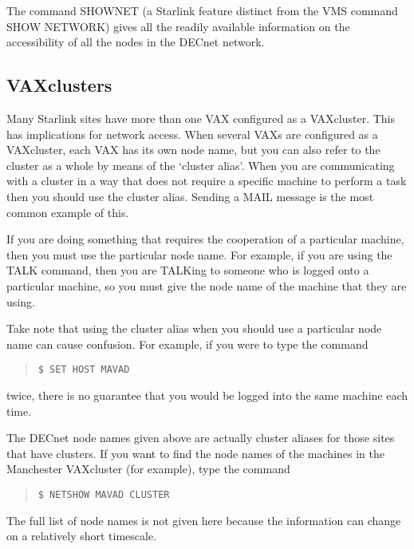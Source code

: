 The command SHOWNET (a Starlink feature distinct from the VMS command SHOW
NETWORK) gives all the readily available information on the accessibility
of all the nodes in the DECnet network.

\subsection{VAXclusters}
Many Starlink sites have more than one VAX configured as a
VAXcluster. This has implications for network access. When several VAXs are
configured as a VAXcluster, each VAX has its own node name, but you can also
refer to the cluster as a whole by means of the `cluster alias'. When you are
communicating with a cluster in a way that does not require a specific machine
to perform a task then you should use the cluster alias. Sending a MAIL message
is the most common example of this.

If you are doing something that requires the cooperation of a particular
machine, then you must use the particular node name. For example, if you are
using the TALK command, then you are TALKing to someone who is logged onto a
particular machine, so you must give the node name of the machine that they are
using. 

Take note that using the cluster alias when you should use a particular node
name can cause confusion. For example, if you were to type the command
\begin{quote}
{\tt \$ SET HOST MAVAD}
\end{quote}
twice, there is no guarantee that you would be logged into the same machine
each time.

The DECnet node names
given above are actually cluster aliases for those sites that have clusters.
If you want to find the node names of the machines in the Manchester VAXcluster
(for example), type the command
\begin{quote}
{\tt \$ NETSHOW MAVAD CLUSTER}
\end{quote}
The full list of node names is not given here because the information can
change on a relatively short timescale.

